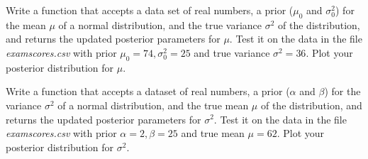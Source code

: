 \begin{problem}
Write a function that accepts a data set of real numbers, a prior ($\mu_{0}$ and $\sigma_{0}^{2}$) for the mean $\mu$ of a normal distribution, and the true variance $\sigma^{2}$ of the distribution, and returns the updated posterior parameters for $\mu$. Test it on the data in the file \emph{examscores.csv} with prior $\mu_{0} = 74, \sigma_{0}^{2} = 25$ and true variance $\sigma^{2} = 36$. Plot your posterior distribution for $\mu$.
\end{problem}

\begin{problem}
Write a function that accepts a dataset of real numbers, a prior ($\alpha$ and $\beta$) for the variance $\sigma^{2}$ of a normal distribution, and the true mean $\mu$ of the distribution, and returns the updated posterior parameters for $\sigma^{2}$. Test it on the data in the file \emph{examscores.csv} with prior $\alpha=2, \beta = 25$ and true mean $\mu = 62$. Plot your posterior distribution for $\sigma^{2}$.
\end{problem}